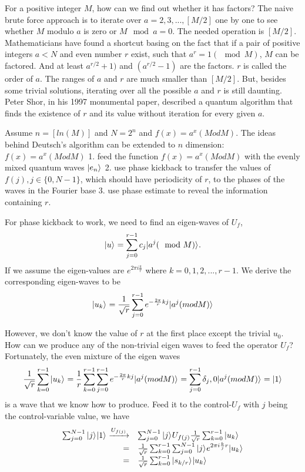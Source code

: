 \documentclass[oneside, letter, 12pt]{book}
\begin{document}
For a positive integer $M$, how can we find out whether it has factors? The naive brute force approach is to iterate over $a=2, 3, ..., [M/2]$ one by one to see whether $M$ modulo $a$ is zero or $M \mod a = 0$. The needed operation is $[M/2]$. Mathematicians have found a shortcut basing on the fact that if a pair of positive integers $a < N$ and even number $r$ exist, such that $a^r = 1(\mod M)$, $M$ can be factored. And at least $a^{r/2}+1)$ and $(a^{r/2}-1)$ are the factors. $r$ is called the order of $a$. The ranges of $a$ and $r$ are much smaller than $[M/2]$. But, besides some trivial solutions, iterating over all the possible $a$ and $r$ is still daunting. Peter Shor, in his 1997 monumental paper\cite{1997Shor}, described a quantum algorithm that finds the existence of $r$ and its value without iteration for every given $a$.

Assume $n = [ln(M)]$ and $N=2^n$ and $f(x) = a^x (Mod M)$. The ideas behind Deutsch's algorithm can be extended to $n$ dimension:$f(x) = a^x (Mod M)$
1. feed the function $f(x) = a^x (Mod M)$ with the evenly mixed quantum waves $\vert {e_n} \rangle_{}$
2. use phase kickback to transfer the values of $f(j), j\in \{0,N-1\}$, which should have periodicity of $r$, to the phases of the waves in the Fourier base
3. use phase estimate to reveal the information containing $r$.

For phase kickback to work, we need to find an eigen-waves of $U_f$,
\begin{equation}\label{keta_u}
    \vert {u} \rangle_{} = \sum^{r-1}_{j=0} c_j \vert {a^j (\mod M)} \rangle_{}.
\end{equation}
If we assume the eigen-values are $e^{2\pi i \frac k r}$ where $k=0, 1, 2, ..., r-1$. We derive the corresponding eigen-waves to be
\begin{equation}\label{keta_uk}
    \vert {u_k} \rangle_{} = \frac 1 {\sqrt{r}} \sum^{r-1}_{j=0} e^{-{\frac {2\pi} r} kj} \vert {a^j (mod M)} \rangle_{}
\end{equation}

However, we don't know the value of $r$ at the first place except the trivial $u_0$. How can we produce any of the non-trivial eigen waves to feed the operator $U_f$? Fortunately, the even mixture of the eigen waves
\begin{equation}\label{sum_u}
    \frac 1 {\sqrt{r}} \sum^{r-1}_{k=0}\vert {u_k} \rangle_{} = \frac 1 r \sum^{r-1}_{k=0} \sum^{r-1}_{j=0} e^{-{\frac {2\pi} r} kj} \vert {a^j (mod M)} \rangle_{} = \sum^{r-1}_{j=0} \delta_j,0 \vert {a^j (mod M)} \rangle_{} = \vert {1} \rangle_{}
\end{equation}
is a wave that we know how to produce. Feed it to the control-$U_f$ with $j$ being the control-variable value, we have
\begin{equation}\label{ctrl_u}
\begin{array}{rl}
 \sum^{N-1}_{j=0} \vert {j} \rangle_{} \vert {1} \rangle_{} \xrightarrow{U_{f(j)}} & \sum^{N-1}_{j=0} \vert {j} \rangle_{} U_{f(j)} \frac 1 {\sqrt{r}} \sum^{r-1}_{k=0}\vert {u_k} \rangle_{}\\
    = & \frac 1 {\sqrt{r}} \sum^{r-1}_{k=0} \sum^{N-1}_{j=0} \vert {j} \rangle_{} e^{2\pi i \frac kj r} \vert {u_k} \rangle_{}\\
    = & \frac 1 {\sqrt{r}} \sum^{r-1}_{k=0} \vert {s_{k/r}} \rangle_{} \vert {u_k} \rangle_{}
\end{array}
\end{equation}
\end{document}
